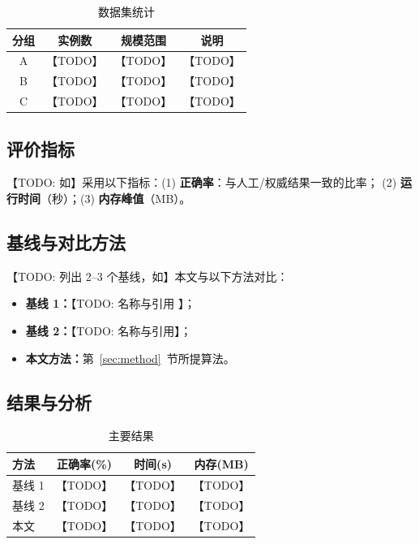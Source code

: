 \documentclass[11pt]{ctexart}
\theoremstyle{plain}
\theoremstyle{definition}
\theoremstyle{remark}
\begin{document}
\begin{table}[htbp]
  \centering
  \caption{数据集统计}
  \label{tab:dataset}
  \begin{tabular}{cccc}
    \toprule
    分组 & 实例数 & 规模范围 & 说明 \\
    \midrule
    A & 【TODO】 & 【TODO】 & 【TODO】 \\
    B & 【TODO】 & 【TODO】 & 【TODO】 \\
    C & 【TODO】 & 【TODO】 & 【TODO】 \\
    \bottomrule
  \end{tabular}
\end{table}

\subsection{评价指标}
\label{sec:exp-metric}
【TODO: 如】采用以下指标：(1) \textbf{正确率}：与人工/权威结果一致的比率；
(2) \textbf{运行时间}（秒）；(3) \textbf{内存峰值}（MB）。

\subsection{基线与对比方法}
\label{sec:exp-baseline}
【TODO: 列出 2--3 个基线，如】本文与以下方法对比：
\begin{itemize}
  \item \textbf{基线 1：}【TODO: 名称与引用 \cite{placeholder-ref}】；
  \item \textbf{基线 2：}【TODO: 名称与引用】；
  \item \textbf{本文方法：}第~\ref{sec:method}~节所提算法。
\end{itemize}

\subsection{结果与分析}
\label{sec:exp-results}
\begin{table}[htbp]
  \centering
  \caption{主要结果}
  \label{tab:results}
  \begin{tabular}{lccc}
    \toprule
    方法 & 正确率(\%) & 时间(s) & 内存(MB) \\
    \midrule
    基线 1 & 【TODO】 & 【TODO】 & 【TODO】 \\
    基线 2 & 【TODO】 & 【TODO】 & 【TODO】 \\
    本文    & 【TODO】 & 【TODO】 & 【TODO】 \\
    \bottomrule
  \end{tabular}
\end{table}
\end{document}
